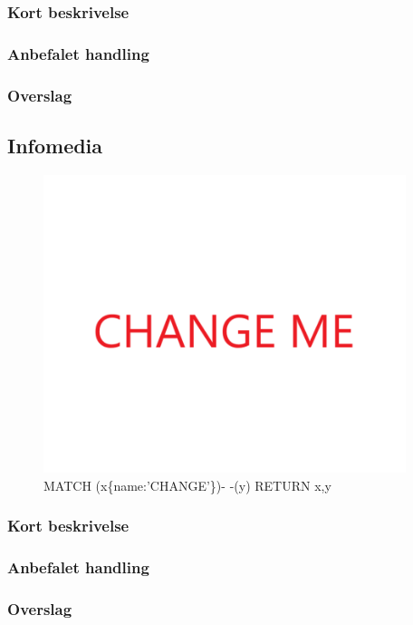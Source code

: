 \documentclass{article}
\begin{document}
\subsubsection{Kort beskrivelse}
\subsubsection{Anbefalet handling}
\subsubsection{Overslag}
\subsection{Infomedia}
\begin{figure}[h]
\includegraphics[width=300pt]{CHANGE.PNG}
\caption{MATCH (x\{name:'CHANGE'\})- -(y) RETURN x,y}
\end{figure}
\subsubsection{Kort beskrivelse}
\subsubsection{Anbefalet handling}
\subsubsection{Overslag}
\end{document}

